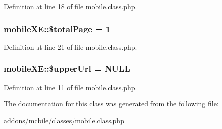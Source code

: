Definition at line 18 of file mobile.\+class.\+php.

\subsubsection[{\texorpdfstring{\$total\+Page}{$totalPage}}]{\setlength{\rightskip}{0pt plus 5cm}mobile\+X\+E\+::\$total\+Page = 1}\hypertarget{classmobileXE_a0d7bcada3689f84f67337d02c8dd6f21}{}\label{classmobileXE_a0d7bcada3689f84f67337d02c8dd6f21}


Definition at line 21 of file mobile.\+class.\+php.

\subsubsection[{\texorpdfstring{\$upper\+Url}{$upperUrl}}]{\setlength{\rightskip}{0pt plus 5cm}mobile\+X\+E\+::\$upper\+Url = N\+U\+LL}\hypertarget{classmobileXE_a643b9ca5393066afea26819e4f1cf115}{}\label{classmobileXE_a643b9ca5393066afea26819e4f1cf115}


Definition at line 11 of file mobile.\+class.\+php.



The documentation for this class was generated from the following file\+:\begin{DoxyCompactItemize}
\item 
addons/mobile/classes/\hyperlink{addons_2mobile_2classes_2mobile_8class_8php}{mobile.\+class.\+php}\end{DoxyCompactItemize}
